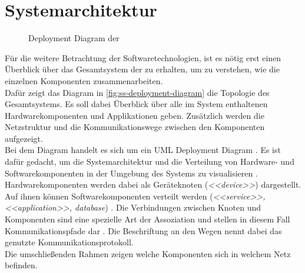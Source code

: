 \chapter{Systemarchitektur}
\label{chap:systemarchitektur}

\begin{figure}
    \centering
    
    \caption{Deployment Diagram der \shst{}}
    \label{fig:ss-deployment-diagram}
\end{figure}

Für die weitere Betrachtung der Softwaretechnologien, ist es nötig erst einen Überblick über 
das Gesamtsystem der \shst{} zu erhalten, um zu verstehen, wie die einzelnen Komponenten
zusammenarbeiten.\\
Dafür zeigt das Diagram in \autoref{fig:ss-deployment-diagram} die Topologie des Gesamtsystems.
Es soll dabei Überblick über alle im System enthaltenen Hardwarekomponenten und Applikationen
geben. Zusätzlich werden die Netzstruktur und die Kommunikationswege zwischen den Komponenten 
aufgezeigt.\\
Bei dem Diagram handelt es sich um ein UML Deployment Diagram \cite{uml-spec}. Es ist dafür 
gedacht, um die Systemarchitektur und die Verteilung von Hardware- und Softwarekomponenten in der 
Umgebung des Systems zu visualisieren \cite{uml-2.5}. Hardwarekomponenten werden dabei als Geräteknoten
(\emph{<<device>>}) dargestellt. Auf ihnen können Softwarekomponenten verteilt werden (\emph{<<service>>,
<<application>>, database}) \cite{uml-diagrams, uml-2.5}. Die Verbindungen zwischen Knoten und Komponenten
sind eine spezielle Art der Assoziation und stellen in diesem Fall Kommunikationspfade dar \cite{uml-2.5}.
Die Beschriftung an den Wegen nennt dabei das genutzte Kommunikationsprotokoll.\\
Die umschließenden Rahmen zeigen welche Komponenten sich in welchem Netz befinden.\\

